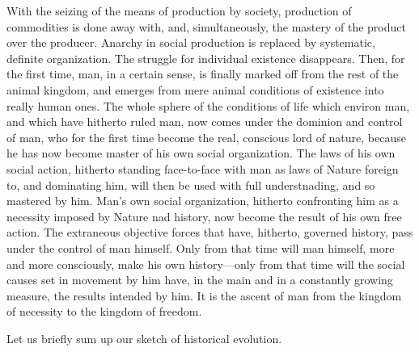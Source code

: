 With the seizing of the means of production by society, production of
commodities is done away with, and, simultaneously, the mastery of the product
over the producer. Anarchy in social production is replaced by systematic,
definite organization. The struggle for individual existence disappears. Then,
for the first time, man, in a certain sense, is finally marked off from the rest
of the animal kingdom, and emerges from mere animal conditions of existence into
really human ones. The whole sphere of the conditions of life which environ man,
and which have hitherto ruled man, now comes under the dominion and control of
man, who for the first time become the real, conscious lord of nature, because
he has now become master of his own social organization. The laws of his own
social action, hitherto standing face-to-face with man as laws of Nature foreign
to, and dominating him, will then be used with full understnading, and so
mastered by him. Man's own social organization, hitherto confronting him as a
necessity imposed by Nature nad history, now become the result of his own free
action. The extraneous objective forces that have, hitherto, governed history,
pass under the control of man himself. Only from that time will man himself,
more and more consciously, make his own history---only from that time will the
social causes set in movement by him have, in the main and in a constantly
growing measure, the results intended by him. It is the ascent of man from the
kingdom of necessity to the kingdom of freedom.

Let us briefly sum up our sketch of historical evolution.

